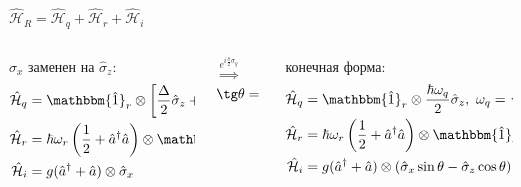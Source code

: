 \documentclass[aspectratio=169, 13pt]{beamer}
\begin{document}
\begin{frame}[noframenumbering, c]\frametitle{\secname}\framesubtitle{\subsecname}
\centering
$\mathcal{\hat H}_R = \hat{\mathcal{H}}_{q}+\hat{\mathcal{H}}_{r}+\hat{\mathcal{H}}_{i}$
\vspace{1cm}
\begin{columns}[c]
	\begin{column}{.4\textwidth}
	\hspace{1.5cm}$\hat \sigma_x$ заменен на $\hat \sigma_z$:
	\begin{align*}
	\hat{\mathcal{H}}_{q} &= \mathbbm{\hat 1}_r \otimes \left[\frac{\Delta}{2} \hat \sigma_z + 				\frac{\varepsilon}{2} \hat \sigma_x \right]\\
	\hat{\mathcal{H}}_{r} &= \hbar \omega_r \left(\frac{1}{2}+\hat a^\dag \hat a \right) \otimes \mathbbm{\hat 1}_q\\
	\hat{\mathcal{H}}_i &= g (\hat a^\dag + \hat a) \otimes \hat \sigma_x
	\end{align*}
	\end{column}

	\begin{column}{0.1\textwidth}	
	{\huge $\overset{e^{i\frac{\theta}{2}\hat \sigma_y}}{\Rightarrow}$}\\
	{\small $\tg \theta = \frac{\varepsilon}{\Delta}$}
	\end{column}
	
	\begin{column}{.5\textwidth}
	\hspace{1cm}конечная форма:
	\begin{align*}
	\hat{\mathcal{H}}_{q} &= \mathbbm{\hat 1}_r \otimes \frac{\hbar \omega_q}{2} \hat \sigma_z,\  \omega_q = \sqrt{\Delta^2+\varepsilon^2} \\
	\hat{\mathcal{H}}_{r} &= \hbar \omega_r  \left(\frac{1}{2}+\hat a^\dag \hat a \right) \otimes \mathbbm{\hat 1}_q\\
	\hat{\mathcal{H}}_i &= g (\hat a^\dag + \hat a) \otimes \left( \hat \sigma_x \sin\theta-  \hat\sigma_z \cos\theta \right)
	\end{align*}
	\end{column}
\end{columns}
\end{frame}
\end{document}
